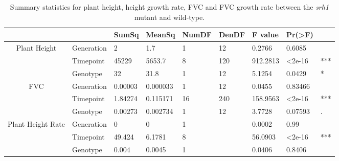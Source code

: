 \documentclass{article}
\begin{document}
\begin{table}[ht]
	\centering
	\caption{Summary statistics for plant height, height growth rate, FVC
		and FVC growth rate between the \textit{srh1} mutant and wild-type.}
	\label{scanalyzer_table}
	\begin{adjustbox}
		{width=\textwidth}
		\begin{tabular}{@{}cllllllll@{}}
			\toprule \multicolumn{1}{l}{\textbf{}}      &               & \textbf{SumSq} & \textbf{MeanSq} & \textbf{NumDF} & \textbf{DenDF} & \textbf{F value} & \textbf{Pr(\textgreater{}F)} &     \\
			\midrule \multirow{3}{*}{Plant Height}      & Generation    & 2              & 1.7             & 1              & 12             & 0.2766           & 0.6085                       &     \\
			                                            & Timepoint     & 45229          & 5653.7          & 8              & 120            & 912.2813         & \textless{}2e-16             & *** \\
			                                            & Genotype      & 32             & 31.8            & 1              & 12             & 5.1254           & 0.0429                       & *   \\
			\midrule \multirow{3}{*}{FVC}               & Generation    & 0.00003        & 0.000033        & 1              & 12             & 0.0455           & 0.83466                      &     \\
			                                            & Timepoint     & 1.84274        & 0.115171        & 16             & 240            & 158.9563         & \textless 2e-16              & *** \\
			                                            & Genotype      & 0.00273        & 0.002734        & 1              & 12             & 3.7728           & 0.07593                      & .   \\
			\midrule \multirow{4}{*}{Plant Height Rate} & Generation    & 0              & 0               & 1              &                & 0.0002           & 0.99                         &     \\
			                                            & Timepoint     & 49.424         & 6.1781          & 8              &                & 56.0903          & \textless{}2e-16             & *** \\
			                                            & Genotype      & 0.004          & 0.0045          & 1              &                & 0.0406           & 0.8406                       &     \\

\end{tabular}
\end{adjustbox}
\end{table}
\end{document}

